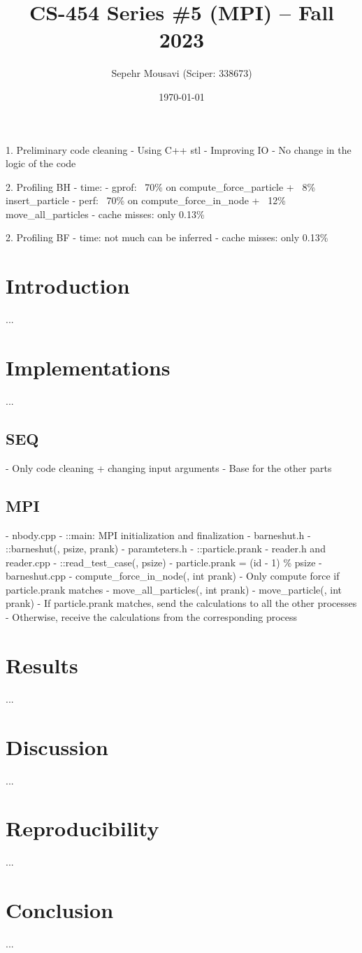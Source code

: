 \documentclass[10pt,journal,compsocconf]{IEEEtran}
\title{CS-454 Series \#5 (MPI) -- Fall 2023}
\author{
  Sepehr Mousavi (Sciper: 338673)
}
\date{\today}
\begin{document}
\maketitle


1. Preliminary code cleaning
  - Using C++ stl
  - Improving IO
  - No change in the logic of the code

2. Profiling BH
  - time:
    - gprof: ~70\% on compute_force_particle + ~8\% insert_particle
    - perf: ~70\% on compute_force_in_node + ~12\% move_all_particles
  - cache misses: only 0.13\%
    
2. Profiling BF
  - time: not much can be inferred
  - cache misses: only 0.13\%


\section{Introduction}
...

\section{Implementations}
...

\subsection{SEQ}
- Only code cleaning + changing input arguments
- Base for the other parts

\subsection{MPI}
- nbody.cpp
  - ::main: MPI initialization and finalization
- barneshut.h
  - ::barneshut(, psize, prank)
- paramteters.h
  - ::particle.prank
- reader.h and reader.cpp
  - ::read_test_case(, psize)
  - particle.prank = (id - 1) \% psize
- barneshut.cpp
  - compute_force_in_node(, int prank)
    - Only compute force if particle.prank matches
  - move_all_particles(, int prank)
  - move_particle(, int prank)
    - If particle.prank matches, send the calculations to all the other processes
    - Otherwise, receive the calculations from the corresponding process

\section{Results}
...

\section{Discussion}
...

\section{Reproducibility}
...

\section{Conclusion}
...
\end{document}
